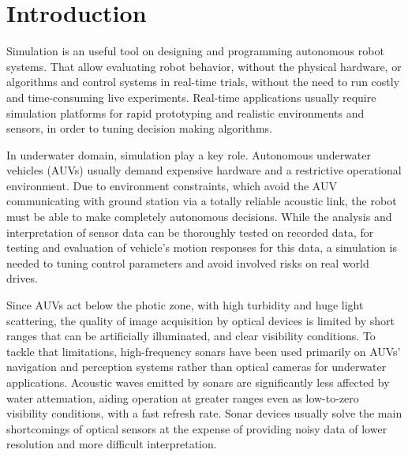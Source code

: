 \documentclass[final,5p,times]{elsarticle}
\begin{document}
\linenumbers

\section{Introduction}
\label{introduction}

Simulation is an useful tool on designing and programming autonomous robot systems. That allow evaluating robot behavior, without the physical hardware, or algorithms and control systems in real-time trials, without the need to run costly and time-consuming live experiments. Real-time applications usually require simulation platforms for rapid prototyping and realistic environments and sensors, in order to tuning decision making algorithms.

In underwater domain, simulation play a key role. Autonomous underwater vehicles (AUVs) usually demand expensive hardware and a restrictive operational environment. Due to environment constraints, which avoid the AUV communicating with ground station via a totally reliable acoustic link, the robot must be able to make completely autonomous decisions. While the analysis and interpretation of sensor data can be thoroughly tested on recorded data, for testing and evaluation of vehicle's motion responses for this data, a simulation is needed to tuning control parameters and avoid involved risks on real world drives.

Since AUVs act below the photic zone, with high turbidity and huge light scattering, the quality of image acquisition by optical devices is limited by short ranges that can be artificially illuminated, and clear visibility conditions. To tackle that limitations, high-frequency sonars have been used primarily on AUVs' navigation and perception systems rather than optical cameras for underwater applications. Acoustic waves emitted by sonars are significantly less affected by water attenuation, aiding operation at greater ranges even as low-to-zero visibility conditions, with a fast refresh rate. Sonar devices usually solve the main shortcomings of optical sensors at the expense of providing noisy data of lower resolution and more difficult interpretation.
\end{document}
